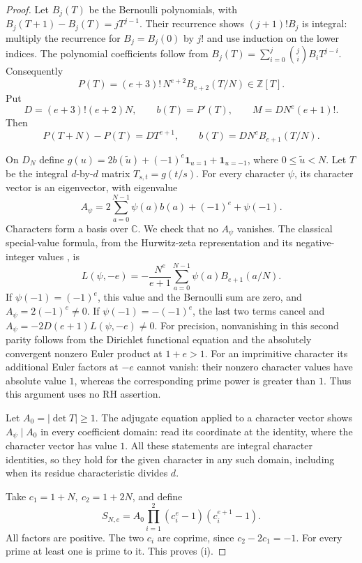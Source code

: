 \documentclass[11pt,a4paper]{article}
\theoremstyle{definition}
\newcommand{\C}{\mathbb C}
\newcommand{\Z}{\mathbb Z}
\begin{document}
\begin{proof}
Let \(B_j(T)\) be the Bernoulli polynomials,
with
\(B_j(T+1)-B_j(T)=jT^{j-1}\).
Their recurrence shows \((j+1)!B_j\) is integral:
multiply the recurrence for \(B_j=B_j(0)\)
by \(j!\) and use induction on the lower
indices. The polynomial coefficients follow
from
\(B_j(T)=\sum_{i=0}^j\binom ji B_iT^{j-i}\).
Consequently
\[
 P(T)=(e+3)!\,N^{e+2}B_{e+2}(T/N)\in\Z[T].
\]
Put
\[
 D=(e+3)!(e+2)N,\qquad b(T)=P'(T),\qquad
 M=D N^e(e+1)! .
\]
Then
\[
 P(T+N)-P(T)=D T^{e+1},\qquad
 b(T)=D N^e B_{e+1}(T/N).
\]

On \(D_N\) define
\(g(u)=2b(\widetilde u)+(-1)^e\mathbf1_{u=1}
                         +\mathbf1_{u=-1}\),
where \(0\le\widetilde u<N\).
Let \(T\) be the integral \(d\)-by-\(d\) matrix
\(T_{s,t}=g(t/s)\).
For every character \(\psi\), its character
vector is an eigenvector, with eigenvalue
\[
 A_\psi=2\sum_{a=0}^{N-1}\psi(a)b(a)
                              +(-1)^e+\psi(-1).
\]
Characters form a basis over \(\C\).
We check that no \(A_\psi\) vanishes.
The classical special-value formula, from the Hurwitz-zeta representation
and its negative-integer values \cite[25.11, 25.15]{dlmf}, is
\[
 L(\psi,-e)=-\frac{N^e}{e+1}
                 \sum_{a=0}^{N-1}\psi(a)B_{e+1}(a/N).
\]
If \(\psi(-1)=(-1)^e\), this value and the
Bernoulli sum are zero, and
\(A_\psi=2(-1)^e\ne0\).
If \(\psi(-1)=-(-1)^e\), the last two terms
cancel and
\(A_\psi=-2D(e+1)L(\psi,-e)\ne0\).
For precision, nonvanishing in this second
parity follows from the Dirichlet functional
equation and the absolutely convergent
nonzero Euler product at \(1+e>1\).
For an imprimitive character its additional
Euler factors at \(-e\) cannot vanish:
their nonzero character values have absolute
value \(1\), whereas the corresponding prime
power is greater than \(1\).
Thus this argument uses no RH assertion.

Let \(A_0=|\det T|\ge1\).
The adjugate equation applied to a character
vector shows \(A_\psi\mid A_0\) in every
coefficient domain: read its coordinate at
the identity, where the character vector
has value \(1\).
All these statements are integral character
identities, so they hold for the given
character in any such domain, including
when its residue characteristic divides \(d\).

Take \(c_1=1+N,\ c_2=1+2N\), and define
\[
 S_{N,e}=A_0\prod_{i=1}^2(c_i^e-1)(c_i^{e+1}-1).
\]
All factors are positive. The two \(c_i\) are
coprime, since \(c_2-2c_1=-1\).
For every prime at least one is prime to it.
This proves (i).


\end{proof}
\end{document}
